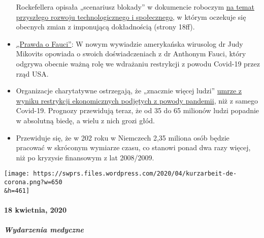 \begin{itemize}
  Rockefellera opisała „scenariusz blokady'' w dokumencie roboczym
  \href{https://swprs.files.wordpress.com/2020/04/rockefeller-foundation-scenarios-2010.pdf}{na
  temat przyszłego rozwoju technologicznego i społecznego}, w którym
  oczekuje się obecnych zmian z imponującą dokładnością (strony 18ff).
\item
  \href{https://childrenshealthdefense.org/news/the-truth-about-fauci-featuring-dr-judy-mikovits/}{„Prawda
  o Fauci''}: W nowym wywiadzie amerykańska wirusolog dr Judy Mikovits
  opowiada o swoich doświadczeniach z dr Anthonym Fauci, który odgrywa
  obecnie ważną rolę we wdrażaniu restrykcji z powodu Covid-19 przez
  rząd USA.
\item
  Organizacje charytatywne ostrzegają, że „znacznie więcej ludzi''
  \href{https://www.welt.de/wirtschaft/article207092745/Corona-Pandemie-Rezession-beschert-der-Welt-die-noch-groessere-Katastrophe.html}{umrze
  z wyniku restrykcji ekonomicznych podjętych z powody pandemii}, niż z
  samego Covid-19. Prognozy przewidują teraz, że od 35 do 65 milionów
  ludzi popadnie w absolutną biedę, a wielu z nich grozi głód.
\item
  Przewiduje się, że w 202 roku w Niemczech 2,35 miliona osób będzie
  pracować w skróconym wymiarze czasu, co stanowi ponad dwa razy więcej,
  niż po kryzysie finansowym z lat 2008/2009.
\end{itemize}

\texttt{[image: https://swprs.files.wordpress.com/2020/04/kurzarbeit-de-corona.png?w=650\\\&h=461]}

\hypertarget{18-kwietnia-2020}{%
\paragraph{18 kwietnia, 2020}\label{18-kwietnia-2020}}

\hypertarget{wydarzenia-medyczne-2}{%
\subparagraph{\texorpdfstring{\textbf{Wydarzenia
medyczne}}{Wydarzenia medyczne}}\label{wydarzenia-medyczne-2}}

